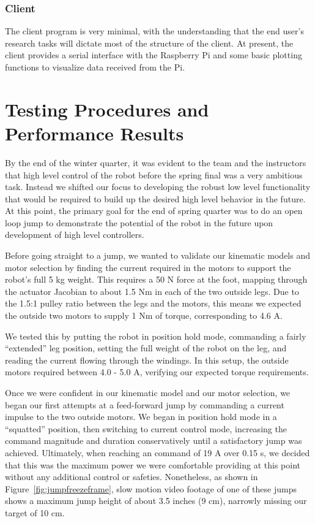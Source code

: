 \documentclass{report}
\begin{document}
\subsection[Client]{Client}
The client program is very minimal, with the understanding that the end user's research tasks will dictate most of the structure of the client. At present, the client provides a serial interface with the Raspberry Pi and some basic plotting functions to visualize data received from the Pi.

\chapter[Testing Procedures and Performance Results]{Testing Procedures and Performance Results}
By the end of the winter quarter, it was evident to the team and the instructors that high level control of the robot before the spring final was a very ambitious task.  Instead we shifted our focus to developing the robust low level functionality that would be required to build up the desired high level behavior in the future.  At this point, the primary goal for the end of spring quarter was to do an open loop jump to demonstrate the potential of the robot in the future upon development of high level controllers.

Before going straight to a jump, we wanted to validate our kinematic models and motor selection by finding the current required in the motors to support the robot's full 5 kg weight. This requires a 50 N force at the foot, mapping through the actuator Jacobian to about 1.5 Nm in each of the two outside legs.  Due to the 1.5:1 pulley ratio between the legs and the motors, this means we expected the outside two motors to supply 1 Nm of torque, corresponding to 4.6 A.  

We tested this by putting the robot in position hold mode, commanding a fairly “extended” leg position, setting the full weight of the robot on the leg, and reading the current flowing through the windings.  In this setup, the outside motors required between 4.0 - 5.0 A, verifying our expected torque requirements.

Once we were confident in our kinematic model and our motor selection, we began our first attempts at a feed-forward jump by commanding a current impulse to the two outside motors. We began in position hold mode in a “squatted” position, then switching to current control mode, increasing the command magnitude and duration conservatively until a satisfactory jump was achieved. Ultimately, when reaching an command of 19 A over 0.15 s, we decided that this was the maximum power we were comfortable providing at this point without any additional control or safeties. Nonetheless, as shown in Figure~\ref{fig:jumpfreezeframe}, slow motion video footage of one of these jumps shows a maximum jump height of about 3.5 inches (9 cm), narrowly missing our target of 10 cm.
\end{document}
